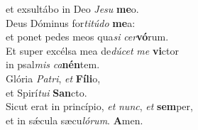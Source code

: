 \evenverse et exsultábo in Deo \textit{Je}\textit{su} \textbf{me}o.\\
\oddverse Deus Dóminus for\textit{ti}\textit{tú}\textit{do} \textbf{me}a:~\*\\
\oddverse et ponet pedes meos qua\textit{si} \textit{cer}\textbf{vó}rum.\\
\evenverse Et super excélsa mea de\textit{dú}\textit{cet} \textit{me} \textbf{vi}ctor~\*\\
\evenverse in psal\textit{mis} \textit{ca}\textbf{nén}tem.\\
\oddverse Glória \textit{Pa}\textit{tri}, \textit{et} \textbf{Fí}\textbf{li}o,~\*\\
\oddverse et Spirí\textit{tu}\textit{i} \textbf{San}cto.\\
\evenverse Sicut erat in princípio, \textit{et} \textit{nunc}, \textit{et} \textbf{sem}per,~\*\\
\evenverse et in sǽcula sæcu\textit{ló}\textit{rum}. \textbf{A}men.\\
